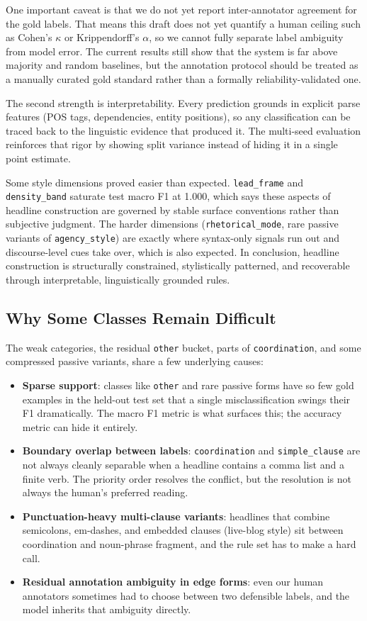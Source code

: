 \documentclass[11pt]{article}
\begin{document}
One important caveat is that we do not yet report inter-annotator agreement for the gold labels. That means this draft does not yet quantify a human ceiling such as Cohen's $\kappa$ or Krippendorff's $\alpha$, so we cannot fully separate label ambiguity from model error. The current results still show that the system is far above majority and random baselines, but the annotation protocol should be treated as a manually curated gold standard rather than a formally reliability-validated one.

The second strength is interpretability. Every prediction grounds in explicit parse features (POS tags, dependencies, entity positions), so any classification can be traced back to the linguistic evidence that produced it. The multi-seed evaluation reinforces that rigor by showing split variance instead of hiding it in a single point estimate.

Some style dimensions proved easier than expected. \texttt{lead\_frame} and \texttt{density\_band} saturate test macro F1 at 1.000, which says these aspects of headline construction are governed by stable surface conventions rather than subjective judgment. The harder dimensions (\texttt{rhetorical\_mode}, rare passive variants of \texttt{agency\_style}) are exactly where syntax-only signals run out and discourse-level cues take over, which is also expected. In conclusion, headline construction is structurally constrained, stylistically patterned, and recoverable through interpretable, linguistically grounded rules.

\subsection{Why Some Classes Remain Difficult}
\label{sec:hard}
The weak categories, the residual \texttt{other} bucket, parts of \texttt{coordination}, and some compressed passive variants, share a few underlying causes:

\begin{itemize}
    \item \textbf{Sparse support}: classes like \texttt{other} and rare passive forms have so few gold examples in the held-out test set that a single misclassification swings their F1 dramatically. The macro F1 metric is what surfaces this; the accuracy metric can hide it entirely.
    \item \textbf{Boundary overlap between labels}: \texttt{coordination} and \texttt{simple\_clause} are not always cleanly separable when a headline contains a comma list and a finite verb. The priority order resolves the conflict, but the resolution is not always the human's preferred reading.
    \item \textbf{Punctuation-heavy multi-clause variants}: headlines that combine semicolons, em-dashes, and embedded clauses (live-blog style) sit between coordination and noun-phrase fragment, and the rule set has to make a hard call.
    \item \textbf{Residual annotation ambiguity in edge forms}: even our human annotators sometimes had to choose between two defensible labels, and the model inherits that ambiguity directly.
\end{itemize}
\end{document}
